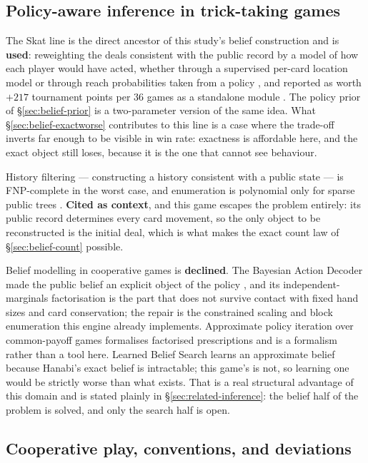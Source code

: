 \subsection{Policy-aware inference in trick-taking games}
\label{app:rel-inference}

The Skat line is the direct ancestor of this study's belief construction and is
\textbf{used}: reweighting the deals consistent with the public record by a
model of how each player would have acted, whether through a supervised
per-card location model \cite{solinas-supervised} or through reach probabilities
taken from a policy \cite{rebstock-inference}, and reported as worth $+217$
tournament points per 36 games as a standalone module \cite{buro-kermit}. The
policy prior of \S\ref{sec:belief-prior} is a two-parameter version of the same
idea. What \S\ref{sec:belief-exactworse} contributes to this line is a case
where the trade-off inverts far enough to be visible in win rate: exactness is
affordable here, and the exact object still loses, because it is the one that
cannot see behaviour.

History filtering --- constructing a history consistent with a public state ---
is FNP-complete in the worst case, and enumeration is polynomial only for sparse
public trees \cite{solinas-history}. \textbf{Cited as context}, and this game
escapes the problem entirely: its public record determines every card movement,
so the only object to be reconstructed is the initial deal, which is what makes
the exact count law of \S\ref{sec:belief-count} possible.

Belief modelling in cooperative games is \textbf{declined}. The Bayesian Action
Decoder made the public belief an explicit object of the policy
\cite{foerster2019bad}, and its independent-marginals factorisation is the part
that does not survive contact with fixed hand sizes and card conservation; the
repair is the constrained scaling and block enumeration this engine already
implements. Approximate policy iteration over common-payoff games
\cite{sokota2021capi} formalises factorised prescriptions and is a formalism
rather than a tool here. Learned Belief Search \cite{hu2021lbs} learns an
approximate belief because Hanabi's exact belief is intractable; this game's is
not, so learning one would be strictly worse than what exists. That is a real
structural advantage of this domain and is stated plainly in
\S\ref{sec:related-inference}: the belief half of the problem is solved, and
only the search half is open.

\subsection{Cooperative play, conventions, and deviations}
\label{app:rel-cooperative}

